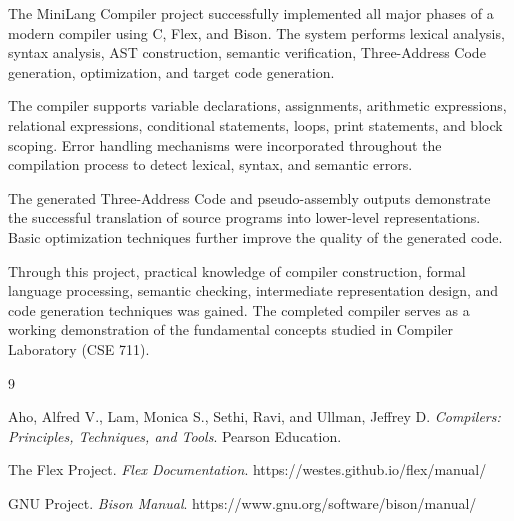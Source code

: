 \documentclass[12pt,a4paper]{report}
\begin{document}
The MiniLang Compiler project successfully implemented all major phases of a modern compiler using C, Flex, and Bison. The system performs lexical analysis, syntax analysis, AST construction, semantic verification, Three-Address Code generation, optimization, and target code generation.

The compiler supports variable declarations, assignments, arithmetic expressions, relational expressions, conditional statements, loops, print statements, and block scoping. Error handling mechanisms were incorporated throughout the compilation process to detect lexical, syntax, and semantic errors.

The generated Three-Address Code and pseudo-assembly outputs demonstrate the successful translation of source programs into lower-level representations. Basic optimization techniques further improve the quality of the generated code.

Through this project, practical knowledge of compiler construction, formal language processing, semantic checking, intermediate representation design, and code generation techniques was gained. The completed compiler serves as a working demonstration of the fundamental concepts studied in Compiler Laboratory (CSE 711).

\begin{thebibliography}{9}

Aho, Alfred V., Lam, Monica S., Sethi, Ravi, and Ullman, Jeffrey D.
\textit{Compilers: Principles, Techniques, and Tools}.
Pearson Education.

The Flex Project.
\textit{Flex Documentation}.
https://westes.github.io/flex/manual/

GNU Project.
\textit{Bison Manual}.
https://www.gnu.org/software/bison/manual/

\end{thebibliography}
\end{document}
